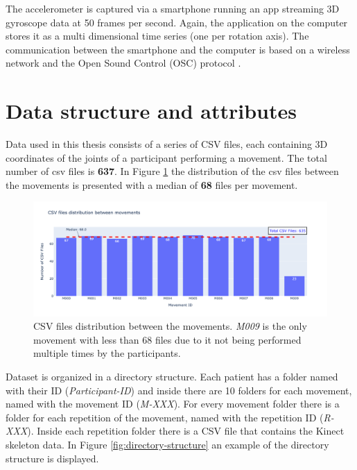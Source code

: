                     The accelerometer is captured via a smartphone running an app streaming 3D gyroscope data at 50 frames per second. Again, the application on the computer stores it as a multi dimensional time series (one per rotation axis). The communication between the smartphone and the computer is based on a wireless network and the Open Sound Control (OSC) protocol \cite{wright_open_nodate}.
    
    \section{Data structure and attributes}
            
            Data used in this thesis consists of a series of CSV files, each containing 3D coordinates of the joints of a participant performing a movement. The total number of csv files is \textbf{637}. In Figure \ref{fig:dataset_files} the distribution of the csv files between the movements is presented with a median of \textbf{68} files per movement.

            \begin{figure}[H]
                \centering 
                \includegraphics[width=1.0\textwidth]{./resources/plots/participants/csv_files.png}
                \caption{CSV files distribution between the movements. \textit{M009} is the only movement with less than 68 files due to it not being performed multiple times by the participants.}
                \label{fig:dataset_files}
            \end{figure}
        
            Dataset is organized in a directory structure. Each patient has a folder named with their ID (\textit{Participant-ID}) and inside there are 10 folders for each movement, named with the movement ID (\textit{M-XXX}). For every movement folder there is a folder for each repetition of the movement, named with the repetition ID (\textit{R-XXX}). Inside each repetition folder there is a CSV file that contains the Kinect skeleton data. In Figure \ref{fig:directory-structure} an example of the directory structure is displayed. \\
            
